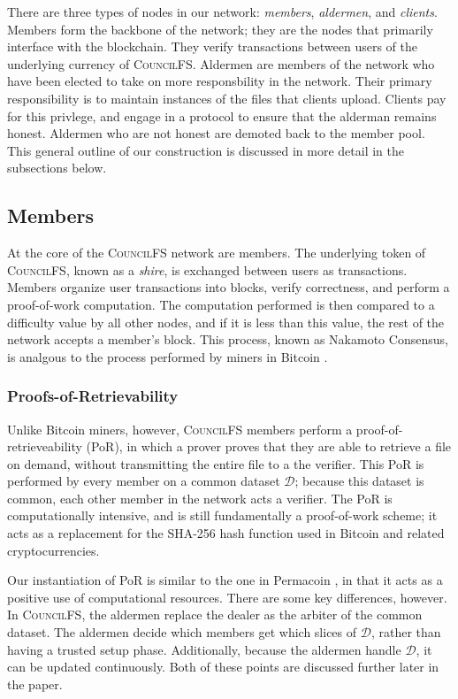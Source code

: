 \documentclass{article}
\begin{document}
There are three types of nodes in our network: \emph{members}, \emph{aldermen},
and \emph{clients}. Members form the backbone of the network; they are the nodes
that primarily interface with the blockchain. They verify transactions between
users of the underlying currency of \textsc{CouncilFS}. Aldermen are members of the
network who have been elected to take on more responsbility in the network.
Their primary responsibility is to maintain instances of the files that clients
upload. Clients pay for this privlege, and engage in a protocol to ensure that
the alderman remains honest. Aldermen who are not honest are demoted back to the
member pool. This general outline of our construction is discussed in more
detail in the subsections below.

\subsection{Members}

At the core of the \textsc{CouncilFS} network are members. The underlying token
of \textsc{CouncilFS}, known as a \emph{shire}, is exchanged between users as
transactions. Members organize user transactions into blocks, verify
correctness, and perform a proof-of-work computation. The computation performed
is then compared to a difficulty value by all other nodes, and if it is less
than this value, the rest of the network accepts a member's block. This process,
known as Nakamoto Consensus, is analgous to the process performed by miners in
Bitcoin \cite{btc}.

\subsubsection{Proofs-of-Retrievability}

Unlike Bitcoin miners, however, \textsc{CouncilFS} members perform a
proof-of-retrieveability (PoR), in which a prover proves that they are able to
retrieve a file on demand, without transmitting the entire file to a the
verifier. This PoR is performed by every member on a common dataset
$\mathcal{D}$; because this dataset is common, each other member in the network
acts a verifier. The PoR is computationally intensive, and is still
fundamentally a proof-of-work scheme; it acts as a replacement for the SHA-256
hash function used in Bitcoin and related cryptocurrencies.

Our instantiation of PoR is similar to the one in Permacoin \cite{perma}, in
that it acts as a positive use of computational resources. There are some key
differences, however. In \textsc{CouncilFS}, the aldermen replace the dealer as
the arbiter of the common dataset. The aldermen decide which members get which
slices of $\mathcal{D}$, rather than having a trusted setup phase. Additionally,
because the aldermen handle $\mathcal{D}$, it can be updated continuously. Both
of these points are discussed further later in the paper.
\end{document}
